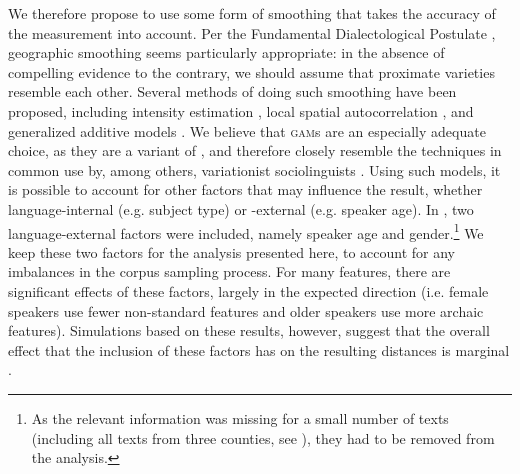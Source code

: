 \documentclass[output=paper]{LSP/langsci}
\begin{document}
We therefore propose to use some form of smoothing that takes the accuracy of the measurement into account.
Per the Fundamental Dialectological Postulate \citep{nerbonne_toward_2007}, geographic smoothing seems particularly appropriate: in the absence of compelling evidence to the contrary, we should assume that proximate varieties resemble each other.
Several methods of doing such smoothing have been proposed, including intensity estimation \citep{rumpf_structural_2009}, local spatial autocorrelation \citep{grieve_corpus-based_2009}, and generalized additive models \citep[\textsc{gam}s;][]{wieling_quantitative_2012}.
We believe that \textsc{gam}s are an especially adequate choice, as they are a variant of , and therefore closely resemble the techniques in common use by, among others, variationist sociolinguists \citep{tagliamonte_variationist_2012}.
Using such models, it is possible to account for other factors that may influence the result, whether language-internal (e.g. subject type) or -external (e.g. speaker age).
In \citet{wolk_integrating_2014}, two language-external factors were included, namely speaker age and gender.\footnote{As the relevant information was missing for a small number of texts (including all texts from three counties, see ), they had to be removed from the analysis.}
We keep these two factors for the analysis presented here, to account for any imbalances in the corpus sampling process.
For many features, there are significant effects of these factors, largely in the expected direction (i.e. female speakers use fewer non-standard features and older speakers use more archaic features).
Simulations based on these results, however, suggest that the overall effect that the inclusion of these factors has on the resulting distances is marginal \citep[233f.]{wolk_integrating_2014}.
\end{document}
